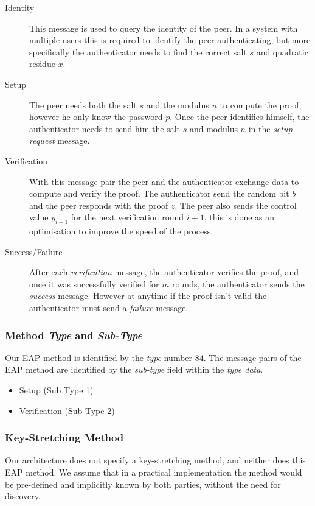 \newpage
\begin{description}
	\item [Identity] This message is used to query the identity of the peer. In a system with multiple users this is required to identify the peer authenticating, but more specifically the authenticator needs to find the correct salt $s$ and quadratic residue $x$. 
	\item [Setup] The peer needs both the salt $s$ and the modulus $n$ to compute the proof, however he only know the password $p$. Once the peer identifies himself, the authenticator needs to send him the salt $s$ and modulus $n$ in the \textit{setup request} message.
	\item [Verification] With this message pair the peer and the authenticator exchange data to compute and verify the proof. The authenticator send the random bit $b$ and the peer responds with the proof $z$. The peer also sends the control value $y_{i+1}$ for the next verification round $i+1$, this is done as an optimisation to improve the speed of the process.
	\item [Success/Failure] After each \textit{verification} message, the authenticator verifies the proof, and once it was successfully verified for $m$ rounds, the authenticator sends the \textit{success} message. However at anytime if the proof isn't valid the authenticator must send a \textit{failure} message.
\end{description}

\subsubsection{Method \textit{Type} and \textit{Sub-Type}}
Our EAP method is identified by the \textit{type} number $84$.
The message pairs of the EAP method are identified by the \textit{sub-type} field within the \textit{type data}.
\begin{itemize}
	\item Setup (Sub Type 1)
	\item Verification (Sub Type 2)
\end{itemize}

\subsubsection{Key-Stretching Method}
Our architecture does not specify a key-stretching method, and neither does this EAP method.
We assume that in a practical implementation the method would be pre-defined and implicitly known by both parties, without the need for discovery.


